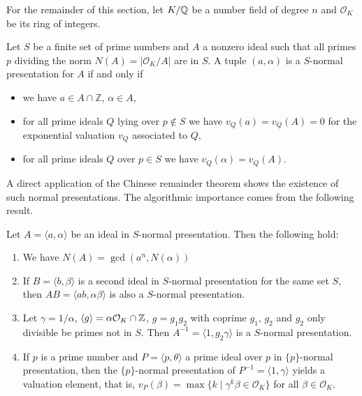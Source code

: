 \documentclass{sig-alternate-05-2015}
\begin{document}
For the remainder of this section, let $K/\mathbb{Q}$ be a number field of
degree $n$ and $\mathcal O_K$ be its ring of integers.

\begin{definition}
Let $S$ be a finite set of prime numbers and $A$ a nonzero ideal such that
all primes $p$ dividing the norm $N(A) = |\mathcal O_K/A|$ are in $S$.
A tuple $(a, \alpha)$ is a $S$-normal presentation for $A$ if and only if
\begin{itemize}
\setlength{\itemsep}{1pt}
\setlength{\parskip}{0pt}
\setlength{\parsep}{0pt}
\item we have $a\in A\cap \mathbb Z$, $\alpha\in A$,
\item for all prime ideals $Q$ lying over $p\not\in S$ we have $v_Q(a)= v_Q(A) = 0$
  for the exponential valuation $v_Q$ associated to $Q$,
\item for all prime ideals $Q$ over $p\in S$ we have $v_Q(\alpha) = v_Q(A)$.
\end{itemize}
\end{definition}

A direct application of the Chinese remainder theorem shows the existence of such normal presentations.
The algorithmic importance comes from the following result.

\begin{theorem}
Let $A = \langle a, \alpha \rangle$ be an ideal in $S$-normal presentation. Then the following hold:
\begin{enumerate}
\item We have $N(A) = \gcd(a^n, N(\alpha))$
\item If $B = \langle b, \beta\rangle$ is a second ideal in $S$-normal
presentation for the same set $S$, then
$AB = \langle ab, \alpha\beta\rangle$ is also a $S$-normal presentation.
\item Let $\gamma = 1/\alpha$, $\langle g\rangle = \alpha \mathcal O_K \cap \mathbb{Z}$,
 $g = g_1g_2$ with coprime $g_1$, $g_2$ and $g_2$ only divisible be primes not in $S$. Then $A^{-1} = \langle 1, g_2\gamma\rangle$ is a $S$-normal presentation.
\item If $p$ is a prime number and $P= \langle p, \theta\rangle$ a prime ideal over $p$
in $\{p\}$-normal presentation, then the $\{p\}$-normal presentation
of $P^{-1} = \langle 1, \gamma\rangle$ yields a valuation element, that is,
$v_P(\beta) = \max\{ k \mid \gamma^k\beta\in \mathcal O_K\}$ for all $\beta \in \mathcal O_K$.
\end{enumerate}
\end{theorem}
\end{document}
